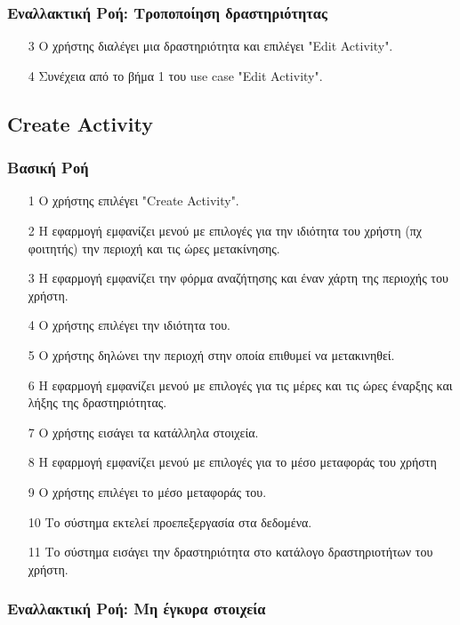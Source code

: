 \subsubsection{Εναλλακτική Ροή: Τροποποίηση δραστηριότητας}

\begin{enumerate}
    \item[3] Ο χρήστης διαλέγει μια δραστηριότητα και επιλέγει "Edit Activity".
    \item[4] Συνέχεια από το βήμα 1 του use case "Edit Activity".
\end{enumerate}

\subsection{Create Activity}

\subsubsection{Βασική Ροή}

\begin{enumerate}
    \item[1] Ο χρήστης επιλέγει "Create Activity".
    \item[2] Η εφαρμογή εμφανίζει μενού με επιλογές για την ιδιότητα του χρήστη (πχ φοιτητής) την
        περιοχή και τις ώρες μετακίνησης.
    \item[3] Η εφαρμογή εμφανίζει την φόρμα αναζήτησης και έναν χάρτη της περιοχής του χρήστη.
    \item[4] Ο χρήστης επιλέγει την ιδιότητα του.
    \item[5] Ο χρήστης δηλώνει την περιοχή στην οποία επιθυμεί να μετακινηθεί.
    \item[6] Η εφαρμογή εμφανίζει μενού με επιλογές για τις μέρες και τις ώρες έναρξης και λήξης
        της δραστηριότητας.
    \item[7] Ο χρήστης εισάγει τα κατάλληλα στοιχεία.
    \item[8] H εφαρμογή εμφανίζει μενού με επιλογές για το μέσο μεταφοράς του χρήστη
    \item[9] Ο χρήστης επιλέγει το μέσο μεταφοράς του.
    \item[10] Το σύστημα εκτελεί προεπεξεργασία στα δεδομένα.
    \item[11] Το σύστημα εισάγει την δραστηριότητα στο κατάλογο δραστηριοτήτων του χρήστη.
\end{enumerate}

\subsubsection{Εναλλακτική Ροή: Μη έγκυρα στοιχεία}

